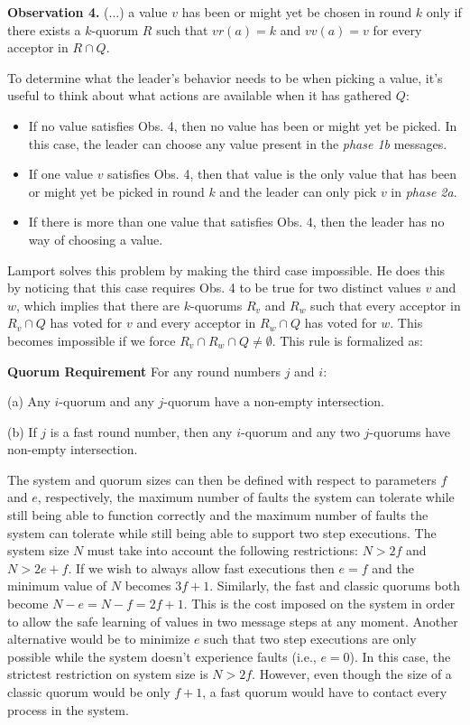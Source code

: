 \begin{displayquote}
	\textbf{Observation 4.} (...) a value $v$ has been or might yet be chosen in round $k$ only if there exists a $k$-quorum $R$ such that $vr(a)=k$ and $vv(a)=v$ for every acceptor in $R \cap Q$.
\end{displayquote}

To determine what the leader's behavior needs to be when picking a value, it's useful to think about what actions are available when it has gathered $Q$:
\begin{itemize}
	\item If no value satisfies Obs. 4, then no value has been or might yet be picked. In this case, the leader can choose any value present in the \textit{phase 1b} messages.
	\item If one value $v$ satisfies Obs. 4, then that value is the only value that has been or might yet be picked in round $k$ and the leader can only pick $v$ in \textit{phase 2a}.
	\item If there is more than one value that satisfies Obs. 4, then the leader has no way of choosing a value.
\end{itemize} 

Lamport solves this problem by making the third case impossible. He does this by noticing that this case requires Obs. 4 to be true for two distinct values $v$ and $w$, which implies that there are $k$-quorums $R_v$ and $R_w$ such that every acceptor in $R_v \cap Q$ has voted for $v$ and every acceptor in $R_w \cap Q$ has voted for $w$. This becomes impossible if we force $R_v \cap R_w \cap Q \neq \emptyset$. This rule is formalized as:

\begin{displayquote}
	\textbf{Quorum Requirement} For any round numbers $j$ and $i$:\par
	(a) Any $i$-quorum and any $j$-quorum have a non-empty intersection.\par
	(b) If $j$ is a fast round number, then any $i$-quorum and any two $j$-quorums have non-empty intersection. 	
\end{displayquote}

The system and quorum sizes can then be defined with respect to parameters $f$ and $e$, respectively, the maximum number of faults the system can tolerate while still being able to function correctly and the maximum number of faults the system can tolerate while still being able to support two step executions. The system size $N$ must take into account the following restrictions: $N > 2f$ and $N > 2e+f$. If we wish to always allow fast executions then $e=f$ and the minimum value of $N$ becomes $3f+1$. Similarly, the fast and classic quorums both become $N-e=N-f= 2f+1$. This is the cost imposed on the system in order to allow the safe learning of values in two message steps at any moment. Another alternative would be to minimize $e$ such that two step executions are only possible while the system doesn't experience faults (i.e., $e=0$). In this case, the strictest restriction on system size is $N>2f$. However, even though the size of a classic quorum would be only $f+1$, a fast quorum would have to contact every process in the system.\par